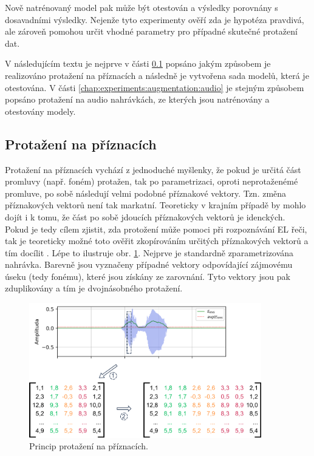 \noindent Nově natrénovaný model pak může být otestován a výsledky porovnány s dosavadními výsledky. Nejenže tyto experimenty ověří zda je hypotéza pravdivá, ale zároveň pomohou určit vhodné parametry pro případné skutečné protažení dat.

V následujícím textu je nejprve v části \ref{chap:experiments:augmentation:features} popsáno jakým způsobem je realizováno protažení na příznacích a následně je vytvořena sada modelů, která je otestována. V části \ref{chap:experiments:augmentation:audio} je stejným způsobem popsáno protažení na audio nahrávkách, ze kterých jsou natrénovány a otestovány modely.

\subsection{Protažení na příznacích}
\label{chap:experiments:augmentation:features}

Protažení na příznacích vychází z jednoduché myšlenky, že pokud je určitá část promluvy (např. foném) protažen, tak po parametrizaci, oproti neprotaženémé promluve, po sobě následují velmi podobné příznakové vektory. Tzn. změna příznakových vektorů není tak markatní. Teoreticky v krajním případě by mohlo dojít i k tomu, že část po sobě jdoucích příznakových vektorů je idenckých. Pokud je tedy cílem zjistit, zda protožení může pomoci při rozpoznávání EL řeči, tak je teoreticky možné toto ověřit zkopírováním určitých příznakových vektorů a tím docílit . Lépe to ilustruje obr. \ref{fig:experiments:augmentation:features}. Nejprve je standardně zparametrizována nahrávka. Barevně jsou vyznačeny případné vektory odpovídající zájmovému úseku (tedy fonému), které jsou získány ze zarovnání. Tyto vektory jsou pak zduplikovány a tím je  dvojnásobného protažení.

\begin{figure}[hbpt]
  \centering
  \includegraphics[width=0.9\textwidth]{./ch5-construction/img/augmentation_features.pdf}
  \caption{Princip protažení na příznacích.}
  \label{fig:experiments:augmentation:features}
\end{figure}

